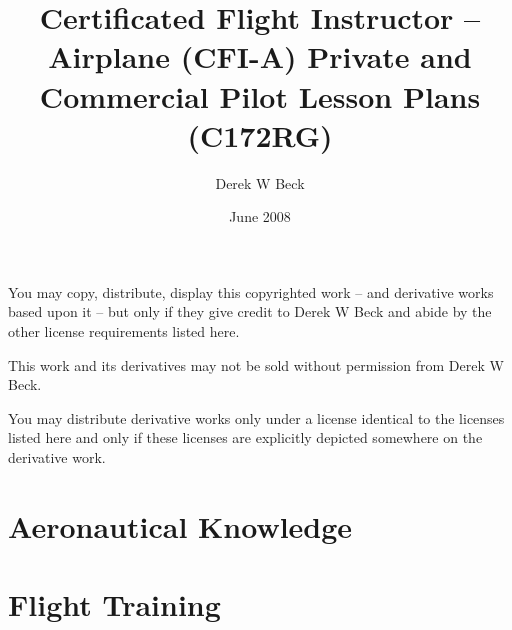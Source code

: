 \documentclass[twoside,openright]{report}
\title{Certificated Flight Instructor – Airplane (CFI-A)
Private and Commercial Pilot Lesson Plans (C172RG)}
\author{Derek W Beck}
\date{June 2008}
\begin{document}
\makeatletter
\begin{titlepage}
  \begin{center}
    \vspace*{1cm}
    \textbf{\@title}

    \vspace*{1cm}
    \@author

    \@date

    \vspace*{2cm}
    \ccby You may copy, distribute, display this copyrighted work -- and
    derivative works based upon it -- but only if they give credit to Derek W
    Beck and abide by the other license requirements listed here.

    \ccnc This work and its derivatives may not be sold without permission from
    Derek W Beck.

    \ccsa You may distribute derivative works only under a license identical to
    the licenses listed here and only if these licenses are explicitly depicted
    somewhere on the derivative work.
  \end{center}
\end{titlepage}

\setcounter{tocdepth}{1}
\tableofcontents

\chapter{Aeronautical Knowledge}






















\chapter{Flight Training}
\end{document}
